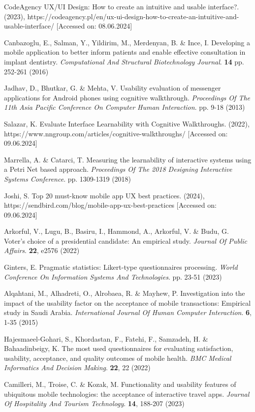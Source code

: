 \documentclass[preprint,12pt]{elsarticle}
\begin{document}
\begin{thebibliography}{99}
CodeAgency UX/UI Design: How to create an intuitive and usable interface?.  (2023), https://codeagency.pl/en/ux-ui-design-how-to-create-an-intuitive-and-usable-interface/ [Accessed on: 08.06.2024]

Canbazoglu, E., Salman, Y., Yildirim, M., Merdenyan, B. \& Ince, I. Developing a mobile application to better inform patients and enable effective consultation in implant dentistry. {\em Computational And Structural Biotechnology Journal}. \textbf{14} pp. 252-261 (2016)

Jadhav, D., Bhutkar, G. \& Mehta, V. Usability evaluation of messenger applications for Android phones using cognitive walkthrough. {\em Proceedings Of The 11th Asia Pacific Conference On Computer Human Interaction}. pp. 9-18 (2013)

Salazar, K. Evaluate Interface Learnability with Cognitive Walkthroughs.  (2022), https://www.nngroup.com/articles/cognitive-walkthroughs/ [Accessed on: 09.06.2024]

Marrella, A. \& Catarci, T. Measuring the learnability of interactive systems using a Petri Net based approach. {\em Proceedings Of The 2018 Designing Interactive Systems Conference}. pp. 1309-1319 (2018)

Joshi, S. Top 20 must-know mobile app UX best practices.  (2024), https://sendbird.com/blog/mobile-app-ux-best-practices [Accessed on: 09.06.2024]

Arkorful, V., Lugu, B., Basiru, I., Hammond, A., Arkorful, V. \& Budu, G. Voter's choice of a presidential candidate: An empirical study. {\em Journal Of Public Affairs}. \textbf{22}, e2576 (2022)

Ginters, E. Pragmatic statistics: Likert-type questionnaires processing. {\em World Conference On Information Systems And Technologies}. pp. 23-51 (2023)

Alqahtani, M., Alhadreti, O., Alrobaea, R. \& Mayhew, P. Investigation into the impact of the usability factor on the acceptance of mobile transactions: Empirical study in Saudi Arabia. {\em International Journal Of Human Computer Interaction}. \textbf{6}, 1-35 (2015)

Hajesmaeel-Gohari, S., Khordastan, F., Fatehi, F., Samzadeh, H. \& Bahaadinbeigy, K. The most used questionnaires for evaluating satisfaction, usability, acceptance, and quality outcomes of mobile health. {\em BMC Medical Informatics And Decision Making}. \textbf{22}, 22 (2022)

Camilleri, M., Troise, C. \& Kozak, M. Functionality and usability features of ubiquitous mobile technologies: the acceptance of interactive travel apps. {\em Journal Of Hospitality And Tourism Technology}. \textbf{14}, 188-207 (2023)


\end{thebibliography}
\end{document}
